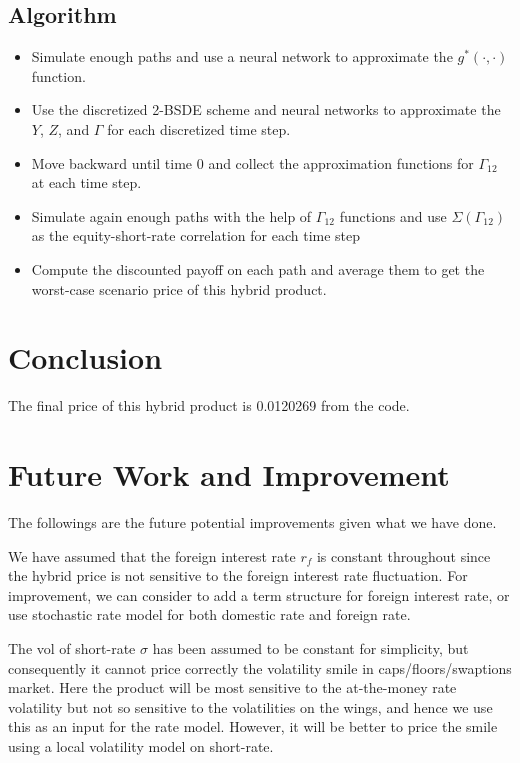 \documentclass[11pt]{article}
\numberwithin{equation}{section}
\theoremstyle{remark}
\begin{document}
\subsection{Algorithm}\label{5.5}
\begin{itemize}
\item Simulate enough paths and use a neural network to approximate the $g^*(\cdot, \cdot)$ function.
\item Use the discretized 2-BSDE scheme and neural networks to approximate the $Y$, $Z$, and $\Gamma$ for each discretized time step.
\item Move backward until time 0 and collect the approximation functions for $\Gamma_{12}$ at each time step.
\item Simulate again enough paths with the help of $\Gamma_{12}$ functions and use $\Sigma(\Gamma_{12})$ as the equity-short-rate correlation for each time step
\item Compute the discounted payoff on each path and average them to get the worst-case scenario price of this hybrid product. 
\end{itemize}

\section{Conclusion}\label{6}
The final price of this hybrid product is 0.0120269 from the code.


\section{Future Work and Improvement}\label{7}
The followings are the future potential improvements given what we have done.

We have assumed that the foreign interest rate $r_f$ is constant throughout since the hybrid price is not sensitive to the foreign interest rate fluctuation. For improvement, we can consider to add a term structure for foreign interest rate, or use stochastic rate model for both domestic rate and foreign rate.

The vol of short-rate $\sigma$ has been assumed to be constant for simplicity, but consequently it cannot price correctly the volatility smile in caps/floors/swaptions market. Here the product will be most sensitive to the at-the-money rate volatility but not so sensitive to the volatilities on the wings, and hence we use this as an input for the rate model. However, it will be better to price the smile using a local volatility model on short-rate.
\end{document}
